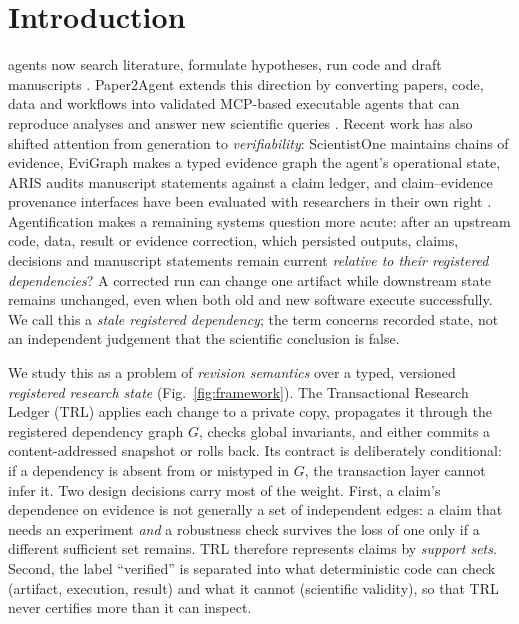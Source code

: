 \documentclass[journal]{IEEEtran}
\begin{document}
\section{Introduction}
\label{sec:intro}
 agents now search literature, formulate hypotheses, run code and draft manuscripts \cite{boiko2023coscientist,bran2024chemcrow,swanson2025virtuallab,schmidgall2025agentlab}. Paper2Agent extends this direction by converting papers, code, data and workflows into validated MCP-based executable agents that can reproduce analyses and answer new scientific queries \cite{miao2026paper2agent}. Recent work has also shifted attention from generation to \emph{verifiability}: ScientistOne maintains chains of evidence, EviGraph makes a typed evidence graph the agent's operational state, ARIS audits manuscript statements against a claim ledger, and claim--evidence provenance interfaces have been evaluated with researchers in their own right \cite{meng2026scientistone,ren2026evigraph,yang2026aris,martinboyle2026papertrail}. Agentification makes a remaining systems question more acute: after an upstream code, data, result or evidence correction, which persisted outputs, claims, decisions and manuscript statements remain current \emph{relative to their registered dependencies}? A corrected run can change one artifact while downstream state remains unchanged, even when both old and new software execute successfully. We call this a \emph{stale registered dependency}; the term concerns recorded state, not an independent judgement that the scientific conclusion is false.

We study this as a problem of \emph{revision semantics} over a typed, versioned \emph{registered research state} (Fig.~\ref{fig:framework}). The Transactional Research Ledger (TRL) applies each change to a private copy, propagates it through the registered dependency graph $G$, checks global invariants, and either commits a content-addressed snapshot or rolls back. Its contract is deliberately conditional: if a dependency is absent from or mistyped in $G$, the transaction layer cannot infer it. Two design decisions carry most of the weight. First, a claim's dependence on evidence is not generally a set of independent edges: a claim that needs an experiment \emph{and} a robustness check survives the loss of one only if a different sufficient set remains. TRL therefore represents claims by \emph{support sets}. Second, the label ``verified'' is separated into what deterministic code can check (artifact, execution, result) and what it cannot (scientific validity), so that TRL never certifies more than it can inspect.
\end{document}
